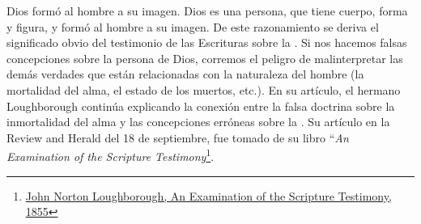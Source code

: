 Dios formó al hombre a su imagen. Dios es una persona, que tiene cuerpo, forma y figura, y formó al hombre a su imagen. De este razonamiento se deriva el significado obvio del testimonio de las Escrituras sobre la . Si nos hacemos falsas concepciones sobre la persona de Dios, corremos el peligro de malinterpretar las demás verdades que están relacionadas con la naturaleza del hombre (la mortalidad del alma, el estado de los muertos, etc.). En su artículo, el hermano Loughborough continúa explicando la conexión entre la falsa doctrina sobre la inmortalidad del alma y las concepciones erróneas sobre la . Su artículo en la Review and Herald del 18 de septiembre, fue tomado de su libro “\textit{An Examination of the Scripture Testimony}\footnote{\href{https://egwwritings.org/?ref=en_MPC.2&para=961.2}{John Norton Loughborough, An Examination of the Scripture Testimony, 1855}}.





% 
